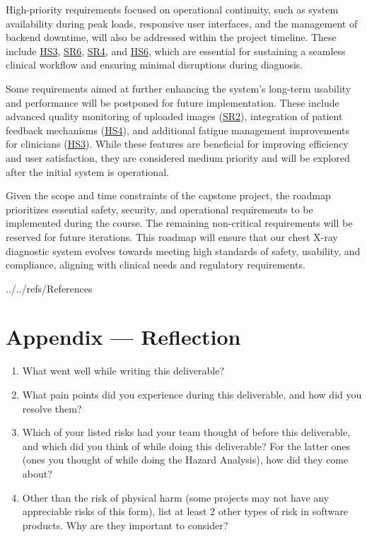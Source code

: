 \documentclass{article}
\begin{document}
\noindent High-priority requirements focused on operational continuity, such as system availability during peak loads, responsive user interfaces, and the management of backend downtime, will also be addressed within the project timeline. These include \hyperlink{HS3}{HS3}, \hyperlink{SR6}{SR6}, \hyperlink{SR4}{SR4}, and \hyperlink{HS6}{HS6}, which are essential for sustaining a seamless clinical workflow and ensuring minimal disruptions during diagnosis.
\vspace{0.2cm}

\noindent Some requirements aimed at further enhancing the system’s long-term usability and performance will be postponed for future implementation. These include advanced quality monitoring of uploaded images (\hyperlink{SR2}{SR2}), integration of patient feedback mechanisms (\hyperlink{HS4}{HS4}), and additional fatigue management improvements for clinicians (\hyperlink{HS3}{HS3}). While these features are beneficial for improving efficiency and user satisfaction, they are considered medium priority and will be explored after the initial system is operational.
\vspace{0.2cm}

\noindent Given the scope and time constraints of the capstone project, the roadmap prioritizes essential safety, security, and operational requirements to be implemented during the course. The remaining non-critical requirements will be reserved for future iterations. This roadmap will ensure that our chest X-ray diagnostic system evolves towards meeting high standards of safety, usability, and compliance, aligning with clinical needs and regulatory requirements.
\newpage{}

 {../../refs/References}
\newpage
\section*{Appendix --- Reflection}



\begin{enumerate}
    \item What went well while writing this deliverable? 
    \item What pain points did you experience during this deliverable, and how
    did you resolve them?
    \item Which of your listed risks had your team thought of before this
    deliverable, and which did you think of while doing this deliverable? For
    the latter ones (ones you thought of while doing the Hazard Analysis), how
    did they come about?
    \item Other than the risk of physical harm (some projects may not have any
    appreciable risks of this form), list at least 2 other types of risk in
    software products. Why are they important to consider?
\end{enumerate}
\end{document}
